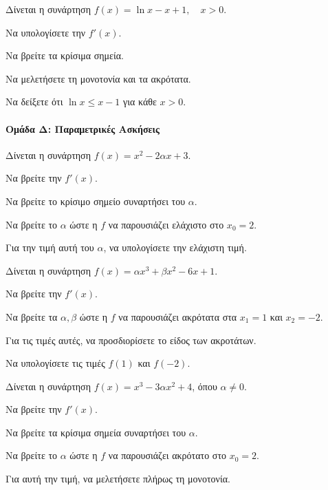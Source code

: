 \documentclass[11pt,a4paper,modern]{FFExercises}
\begin{document}
\askhsh
Δίνεται η συνάρτηση $f(x) = \ln x - x + 1, \quad x > 0$.
\begin{alist}
    \item Να υπολογίσετε την $f'(x)$.
    \item Να βρείτε τα κρίσιμα σημεία.
    \item Να μελετήσετε τη μονοτονία και τα ακρότατα.
    \item Να δείξετε ότι $\ln x \le x - 1$ για κάθε $x > 0$.
\end{alist}

\paragraph{Ομάδα Δ: Παραμετρικές Ασκήσεις}

\askhsh
Δίνεται η συνάρτηση $f(x) = x^2 - 2\alpha x + 3$.
\begin{alist}
    \item Να βρείτε την $f'(x)$.
    \item Να βρείτε το κρίσιμο σημείο συναρτήσει του $\alpha$.
    \item Να βρείτε το $\alpha$ ώστε η $f$ να παρουσιάζει ελάχιστο στο $x_0 = 2$.
    \item Για την τιμή αυτή του $\alpha$, να υπολογίσετε την ελάχιστη τιμή.
\end{alist}

\askhsh
Δίνεται η συνάρτηση $f(x) = \alpha x^3 + \beta x^2 - 6x + 1$.
\begin{alist}
    \item Να βρείτε την $f'(x)$.
    \item Να βρείτε τα $\alpha, \beta$ ώστε η $f$ να παρουσιάζει ακρότατα στα $x_1 = 1$ και $x_2 = -2$.
    \item Για τις τιμές αυτές, να προσδιορίσετε το είδος των ακροτάτων.
    \item Να υπολογίσετε τις τιμές $f(1)$ και $f(-2)$.
\end{alist}

\askhsh
Δίνεται η συνάρτηση $f(x) = x^3 - 3\alpha x^2 + 4$, όπου $\alpha \neq 0$.
\begin{alist}
    \item Να βρείτε την $f'(x)$.
    \item Να βρείτε τα κρίσιμα σημεία συναρτήσει του $\alpha$.
    \item Να βρείτε το $\alpha$ ώστε η $f$ να παρουσιάζει ακρότατο στο $x_0 = 2$.
    \item Για αυτή την τιμή, να μελετήσετε πλήρως τη μονοτονία.
\end{alist}
\end{document}
